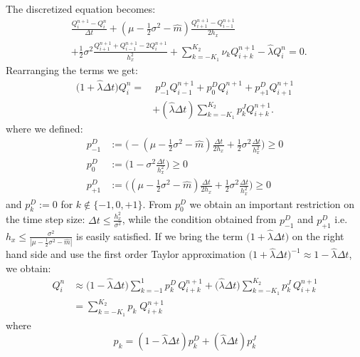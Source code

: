 The discretized equation becomes:
\begin{align}
&\frac{Q^{n+1}_{i} -Q^{n}_{i}}{\Delta t} + 
(\mu-\frac{1}{2}\sigma^2 - \hat m) \frac{Q^{n+1}_{i+1} -Q^{n+1}_{i-1}}{ 2 h_x} \\ \nonumber
&+ \frac{1}{2} \sigma^2 \frac{Q^{n+1}_{i+1} + Q^{n+1}_{i-1} - 2 Q^{n+1}_{i}}{h_x^2} 
 + \sum_{k = -K_1}^{K_2} \nu_k Q^{n+1}_{i+k} - \hat \lambda Q^{n}_i = 0.
\end{align}
Rearranging the terms we get: 
\begin{align*}
\biggl(1+ \hat \lambda \Delta t \biggr) Q^{n}_{i} =& \; p^D_{-1} Q^{n+1}_{i-1} + p^D_{0} Q^{n+1}_{i} + p^D_{+1} Q^{n+1}_{i+1} \\
&+ (\hat \lambda \Delta t) \sum_{k = -K_1}^{K_2} p^J_k Q^{n+1}_{i+k}.
\end{align*}
where we defined:
\begin{align}\label{pD} \nonumber
 p^D_{-1} &:= \bigl( -(\mu-\frac{1}{2}\sigma^2 -\hat m)\frac{\Delta t}{2 h_x} + \frac{1}{2}\sigma^2 \frac{\Delta t}{h_x^2}  \bigr) \geq 0 \\ 
 p^D_{0} &:= \bigl( 1 - \sigma^2 \frac{\Delta t}{h_x^2} \bigr) \geq 0 \\ \nonumber 
 p^D_{+1} &:= \bigl( (\mu-\frac{1}{2}\sigma^2 -\hat m)\frac{\Delta t}{2 h_x} + \frac{1}{2}\sigma^2 \frac{\Delta t}{h_x^2}  \bigr) \geq 0 
\end{align}
and $p^D_k := 0$ for $k \not \in \{-1,0,+1\}$.
From $p^D_0$ we obtain an important restriction on the time step size: $\Delta t \leq \frac{h_x^2}{\sigma^2}$, while the condition obtained from $p^D_{-1}$ and $p^D_{+1}$ i.e. 
$h_x \leq \frac{\sigma^2}{|\mu-\frac{1}{2}\sigma^2 -\hat m|}$ is easily satisfied.
If we bring the term $\bigl(1+\hat \lambda \Delta t \bigr)$ on the right hand side and use the first order Taylor approximation 
$\bigl(1+\hat \lambda \Delta t \bigr)^{-1} \approx 1 - \hat \lambda \Delta t$, we obtain: 
\begin{align}\label{expectation_tot}
 Q^{n}_{i} &\approx \bigl(1 - \hat \lambda \Delta t \bigr) \sum_{k=-1}^1 p^D_k \, Q^{n+1}_{i+k} 
           + \bigl( \hat \lambda \Delta t \bigr) \sum_{k = -K_1}^{K_2} p^J_k \, Q^{n+1}_{i+k} \\ 
           &= \sum_{k = -K_1}^{K_2} p_k \; Q^{n+1}_{i+k} \nonumber
\end{align}
where 
\begin{equation}\label{pK}
p_k = (1 - \hat \lambda \Delta t) p^D_k + ( \hat \lambda \Delta t ) p^J_k 
\end{equation}

